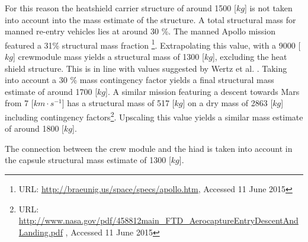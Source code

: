 For this reason the heatshield carrier structure of around 1500 [$kg$] \cite{Ainsworth2014} is not taken into account into the mass estimate of the structure. A total structural mass for manned re-entry vehicles lies at around 30 \%. The manned Apollo mission featured a 31\% structural mass fraction \footnote{URL: \url{http://braeunig.us/space/specs/apollo.htm}, Accessed 11 June 2015}. Extrapolating this value, with a 9000 [$kg$] crewmodule mass yields a structural mass of 1300 [$kg$], excluding the heat shield structure. This is in line with values suggested by Wertz et al. \cite{Wertz2011}. Taking into account a 30 \% mass contingency factor yields a final structural mass estimate of around 1700 [$kg$]. A similar mission featuring a descent towards Mars from 7 [$km \cdot s^{-1}$] has a structural mass of 517 [$kg$] on a dry mass of 2863 [$kg$] including contingency factors\footnote{URL: \url{http://www.nasa.gov/pdf/458812main\_FTD\_AerocaptureEntryDescentAndLanding.pdf} , Accessed 11 June 2015 }. Upscaling this value yields a similar mass estimate of around 1800 [$kg$]. 

The connection between the crew module and the \gls{hiad} is taken into account in the capsule structural mass estimate of 1300 [$kg$]. 



